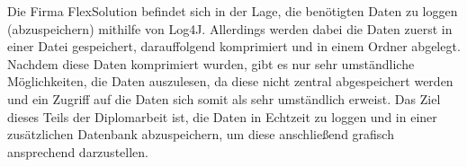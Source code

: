Die Firma FlexSolution befindet sich in der Lage, die benötigten Daten zu loggen (abzuspeichern) mithilfe von Log4J. Allerdings werden dabei die Daten zuerst in einer Datei gespeichert, darauffolgend komprimiert und in einem Ordner abgelegt. Nachdem diese Daten komprimiert wurden, gibt es nur sehr umständliche Möglichkeiten, die Daten auszulesen, da diese nicht zentral abgespeichert werden und ein Zugriff auf die Daten sich somit als sehr umständlich erweist. Das Ziel dieses Teils der Diplomarbeit ist, die Daten in Echtzeit zu loggen und in einer zusätzlichen Datenbank abzuspeichern, um diese anschließend grafisch ansprechend darzustellen.
 

